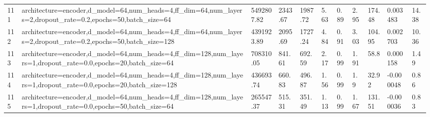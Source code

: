 \begin{longtable}{C{0.8cm} L{2cm} C{1.15cm} C{1.15cm} C{1.15cm} C{1.15cm} C{0.85cm} C{1.25cm} C{1.2cm} C{1.5cm} C{1.0cm}}
111 & architecture=encoder,\newline d\_model=64,\newline num\_heads=4,\newline ff\_dim=64,\newline num\_layers=2,\newline dropout\_rate=0.2,\newline epochs=50,\newline batch\_size=64 & 5492807.82 & 2343.67 & 1987.72 & 5.63 & 0.89 & 2.95 & 174.48 & 0.003483 & 14.38 \\
112 & architecture=encoder,\newline d\_model=64,\newline num\_heads=4,\newline ff\_dim=64,\newline num\_layers=2,\newline dropout\_rate=0.2,\newline epochs=50,\newline batch\_size=128 & 4391923.89 & 2095.69 & 1727.24 & 4.84 & 0.91 & 3.03 & 104.95 & 0.002703 & 10.36 \\
113 & architecture=encoder,\newline d\_model=64,\newline num\_heads=4,\newline ff\_dim=128,\newline num\_layers=1,\newline dropout\_rate=0.0,\newline epochs=20,\newline batch\_size=64 & 708310.05 & 841.61 & 692.59 & 2.17 & 0.99 & 1.91 & 58.8 & 0.000158 & 1.49 \\
114 & architecture=encoder,\newline d\_model=64,\newline num\_heads=4,\newline ff\_dim=128,\newline num\_layers=1,\newline dropout\_rate=0.0,\newline epochs=20,\newline batch\_size=128 & 436693.74 & 660.83 & 496.87 & 1.56 & 0.99 & 1.9 & 32.92 & -0.000048 & 0.86 \\
115 & architecture=encoder,\newline d\_model=64,\newline num\_heads=4,\newline ff\_dim=128,\newline num\_layers=1,\newline dropout\_rate=0.0,\newline epochs=50,\newline batch\_size=64 & 265547.37 & 515.31 & 351.49 & 1.13 & 0.99 & 1.67 & 131.51 & -0.000036 & 0.83 \\

\end{longtable}
